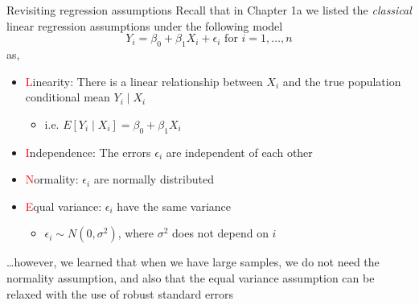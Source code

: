 \documentclass[10pt,t]{beamer}
\begin{document}
\begin{frame}{Revisiting regression assumptions}
Recall that in Chapter 1a we listed the \textit{classical} linear regression assumptions under the following model
$$
Y_i = \beta_0 + \beta_1 X_i + \epsilon_i \text{ for } i = 1, \dots, n
$$
as,
\vspace{0.3cm}
\begin{itemize}
	\item \textcolor{red}{L}inearity: There is a linear relationship between $X_i$ and the true population conditional mean $Y_i \mid X_i$
	\begin{itemize}
		\item i.e. $E[Y_i \mid X_i] = \beta_0 + \beta_1 X_i$
	\end{itemize}
	\item \textcolor{red}{I}ndependence: The errors $\epsilon_i$ are independent of each other
	\item \textcolor{red}{N}ormality: $\epsilon_i$ are normally distributed
	\item \textcolor{red}{E}qual variance: $\epsilon_i$ have the same variance
	\begin{itemize}
		\item $\epsilon_i \sim N(0, \sigma^2)$, where $\sigma^2$ does not depend on $i$
	\end{itemize}
\end{itemize}

\vspace{0.2cm}

\dots however, we learned that when we have large samples, we do not need the normality assumption, and also that the equal variance assumption can be relaxed with the use of robust standard errors

\end{frame}
\end{document}
